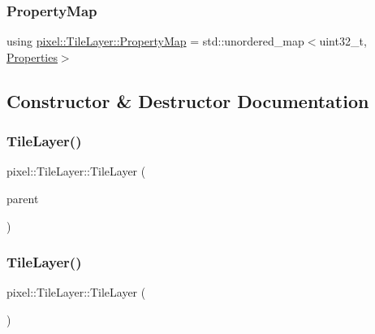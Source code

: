 \subsubsection{\texorpdfstring{Property\+Map}{PropertyMap}}
{\footnotesize\ttfamily using \hyperlink{classpixel_1_1_tile_layer_a574b12c49854419c8ffb25e3a0929b57}{pixel\+::\+Tile\+Layer\+::\+Property\+Map} =  std\+::unordered\+\_\+map$<$uint32\+\_\+t, \hyperlink{structpixel_1_1_tile_layer_1_1_properties}{Properties}$>$}



\subsection{Constructor \& Destructor Documentation}
\mbox{\label{classpixel_1_1_tile_layer_af2c7a21a841b0d7c079844953f82e983}} 
\subsubsection{\texorpdfstring{Tile\+Layer()}{TileLayer()}\hspace{0.1cm}{\footnotesize\ttfamily [1/2]}}
{\footnotesize\ttfamily pixel\+::\+Tile\+Layer\+::\+Tile\+Layer (\begin{DoxyParamCaption}\item[{\hyperlink{classpixel_1_1_tile_map}{Tile\+Map} $\ast$}]{parent }\end{DoxyParamCaption})}

\mbox{\label{classpixel_1_1_tile_layer_ab9db42e7f9328be9d02383a47723bd4c}} 
\subsubsection{\texorpdfstring{Tile\+Layer()}{TileLayer()}\hspace{0.1cm}{\footnotesize\ttfamily [2/2]}}
{\footnotesize\ttfamily pixel\+::\+Tile\+Layer\+::\+Tile\+Layer (\begin{DoxyParamCaption}\item[{const \hyperlink{classpixel_1_1_tile_layer}{Tile\+Layer} \&}]{ }\end{DoxyParamCaption})\hspace{0.3cm}{\ttfamily [default]}}



